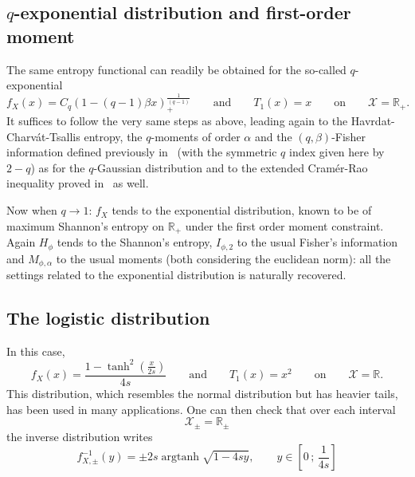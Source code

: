 \documentclass[entropy,article,submit,moreauthors,pdftex]{Definitions/mdpi}
\def\Rset{\mathbb{R}}
\def\X{\mathcal{X}}
\def\argtanh{\operatorname{argtanh}}
\begin{document}

\subsection{$q$-exponential distribution and first-order moment}
\label{subsec:qExponentialFirstOrder}

The  same  entropy  functional  can   readily  be  obtained  for  the  so-called
$q$-exponential
% 
\[
f_X(x)  =  C_q \left(  1  -  (q-1)  \beta x  \right)_+^{\frac{1}{(q-1)}}  \qquad
\mbox{and} \qquad T_1(x) = x \qquad \mbox{on} \qquad \X = \Rset_+.
\]
%
It  suffices to  follow the  very  same steps  as  above, leading  again to  the
Havrdat-Charv\'at-Tsallis  entropy, the  $q$-moments of  order $\alpha$  and the
$(q,\beta)$-Fisher information  defined previously  in~\cite{LutYan05, LutYan07,
  LutLv12, Ber12:06_1,  Ber12:06_2, Ber13} (with  the symmetric $q$  index given
here  by  $2-q$) as  for  the  $q$-Gaussian  distribution  and to  the  extended
Cram\'er-Rao inequality proved in~\cite{Ber12:06_2, Ber13} as well.

Now when $q \to 1$: $f_X$ tends  to the exponential distribution, known to be of
maximum  Shannon's   entropy  on   $\Rset_+$  under   the  first   order  moment
constraint. Again $H_\phi$  tends to the Shannon's entropy,  $I_{\phi,2}$ to the
usual  Fisher's information  and $M_{\phi,\alpha}$  to the  usual moments  (both
considering the  euclidean norm):  all the settings  related to  the exponential
distribution is naturally recovered.




\subsection{The logistic distribution}
\label{subsec:Logistic}

In this case, 
%
\[
f_X(x)  = \frac{1  -  \tanh^2\!\left(\frac{x}{2s}\right)}{4s} \qquad  \mbox{and}
\qquad T_1(x) = x^2 \qquad \mbox{on} \qquad \X = \Rset.
\]
This  distribution, which  resembles  the normal  distribution  but has  heavier
tails, has  been used in  many applications. One can  then check that  over each
interval
%
\[
\X_\pm = \Rset_\pm
\]
%
the inverse distribution writes 
%
\[
f_{X,\pm}^{-1}(y) = \pm 2 s \argtanh \sqrt{1-4sy}, \qquad y \in \left[ 0 \, ; \,
  \frac{1}{4s} \right]
\]
\end{document}

